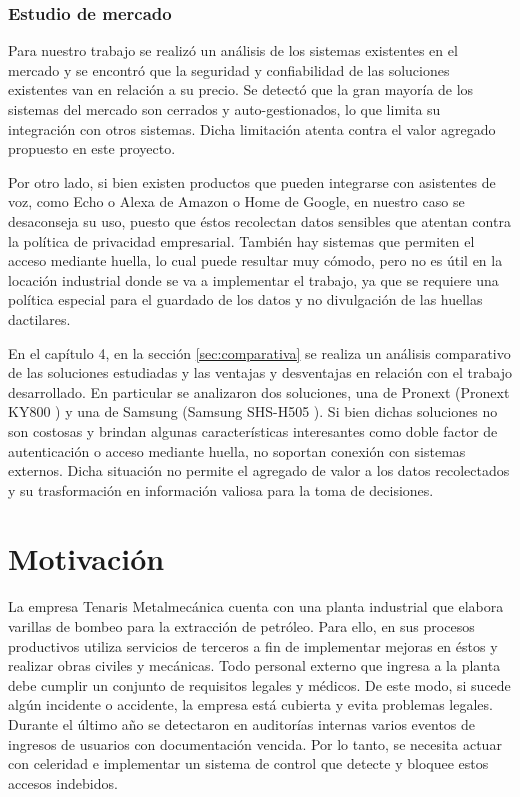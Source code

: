 \subsubsection{Estudio de mercado}

Para nuestro trabajo se realizó un análisis de los sistemas existentes en el mercado y se encontró que la seguridad y confiabilidad de las soluciones existentes van en relación a su precio. Se detectó que la gran mayoría de los sistemas del mercado son cerrados y auto-gestionados, lo que limita su integración con otros sistemas. Dicha limitación atenta contra el valor agregado propuesto en este proyecto.

Por otro lado, si bien existen productos que pueden integrarse con asistentes de voz, como Echo o Alexa de Amazon o Home de Google, en nuestro caso se desaconseja su uso, puesto que éstos recolectan datos sensibles que atentan contra la política de privacidad empresarial. También hay sistemas que permiten el acceso mediante huella, lo cual puede resultar muy cómodo, pero no es útil en la locación industrial donde se va a implementar el trabajo, ya que se requiere una política especial para el guardado de los datos y no divulgación de las huellas dactilares. 

En el capítulo 4, en la sección \ref{sec:comparativa} se realiza un análisis comparativo de las soluciones estudiadas y las ventajas y desventajas en relación con el trabajo desarrollado. En particular se analizaron dos soluciones, una de Pronext (Pronext KY800 \citep{WEBSITE:Ponext}) y una de Samsung (Samsung SHS-H505 \citep{WEBSITE:Samsung}). Si bien dichas soluciones no son costosas y brindan algunas características interesantes como doble factor de autenticación
o acceso mediante huella, no soportan conexión con sistemas externos. Dicha situación no permite el agregado de valor a los datos recolectados y su trasformación en información valiosa para la toma de decisiones.



\section{Motivación}

La empresa Tenaris Metalmecánica cuenta con una planta industrial que elabora varillas de bombeo para la extracción de petróleo. Para ello, en sus procesos productivos utiliza servicios de terceros a fin de implementar mejoras en éstos y realizar obras civiles y mecánicas. Todo personal externo que ingresa a la planta debe cumplir un conjunto de requisitos legales y médicos. De este modo, si sucede algún incidente o accidente, la empresa está cubierta y evita problemas legales. Durante el último año se detectaron en auditorías internas varios eventos de ingresos de usuarios con documentación vencida. Por lo tanto, se necesita actuar con celeridad e implementar un sistema de control que detecte y bloquee estos accesos indebidos.

